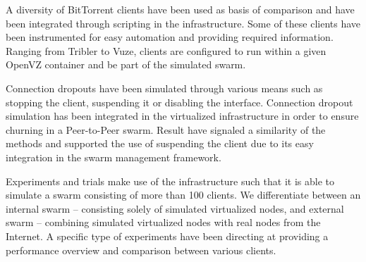 A diversity of BitTorrent clients have been used as basis of comparison and
have been integrated through scripting in the infrastructure. Some of these
clients have been instrumented for easy automation and providing required
information. Ranging from Tribler to Vuze, clients are configured to run
within a given OpenVZ container and be part of the simulated swarm.

Connection dropouts have been simulated through various means such as stopping
the client, suspending it or disabling the interface. Connection dropout
simulation has been integrated in the virtualized infrastructure in order to
ensure churning in a Peer-to-Peer swarm. Result have signaled a similarity of
the methods and supported the use of suspending the client due to its easy
integration in the swarm management framework.

Experiments and trials make use of the infrastructure such that it is able to
simulate a swarm consisting of more than 100 clients. We differentiate between
an internal swarm -- consisting solely of simulated virtualized nodes, and
external swarm -- combining simulated virtualized nodes with real nodes from
the Internet. A specific type of experiments have been directing at providing
a performance overview and comparison between various clients.
